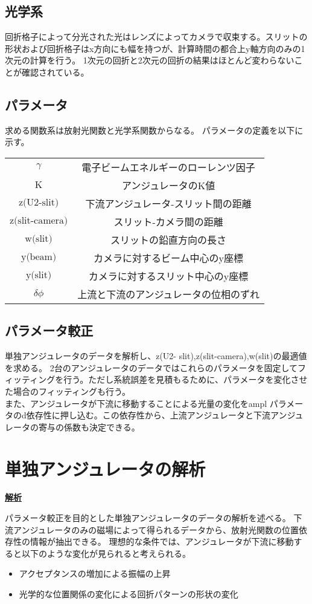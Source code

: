 \documentclass[a4paper,11pt,uplatex]{jsbook}
\begin{document}
\subsection{光学系}
回折格子によって分光された光はレンズによってカメラで収束する。スリットの形状および回折格子はx方向にも幅を持つが、計算時間の都合上y軸方向のみの1次元の計算を行う。
1次元の回折と2次元の回折の結果はほとんど変わらないことが確認されている。
\subsection{パラメータ}
求める関数系は放射光関数と光学系関数からなる。
パラメータの定義を以下に示す。
\begin{table}[h]
\centering
\begin{tabular}{c|c}
  $\gamma$ & 電子ビームエネルギーのローレンツ因子 \\
  $\text{K}$ & アンジュレータのK値 \\
  $\text{z(U2-slit)}$ & 下流アンジュレータ-スリット間の距離 \\
  $\text{z(slit-camera)}$ & スリット-カメラ間の距離 \\
  $\text{w(slit)}$ & スリットの鉛直方向の長さ \\
  $\text{y(beam)}$ & カメラに対するビーム中心のy座標 \\
  $\text{y(slit)}$ & カメラに対するスリット中心のy座標 \\
  $\delta \phi$ & 上流と下流のアンジュレータの位相のずれ\\
\end{tabular}
\end{table}

\subsection{パラメータ較正}
単独アンジュレータのデータを解析し、z(U2- slit),z(slit-camera),w(slit)の最適値を求める。
2台のアンジュレータのデータではこれらのパラメータを固定してフィッティングを行う。ただし系統誤差を見積もるために、パラメータを変化させた場合のフィッティングも行う。\\
また、アンジュレータが下流に移動することによる光量の変化をampl パラメータのd依存性に押し込む。この依存性から、上流アンジュレータと下流アンジュレータの寄与の係数も決定できる。
\section{単独アンジュレータの解析}
\noindent \textbf{\underline{解析}}\par
パラメータ較正を目的とした単独アンジュレータのデータの解析を述べる。
下流アンジュレータのみの磁場によって得られるデータから、放射光関数の位置依存性の情報が抽出できる。
理想的な条件では、アンジュレータが下流に移動すると以下のような変化が見られると考えられる。
\begin{itemize}
  \item アクセプタンスの増加による振幅の上昇
  \item 光学的な位置関係の変化による回折パターンの形状の変化
\end{itemize}
\end{document}
